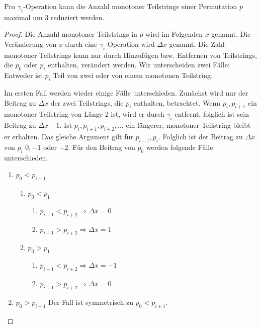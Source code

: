 \documentclass[a4paper, 10pt, ngerman]{article}
\begin{document}
\begin{lemma}
    Pro $\gamma_i$-Operation kann die Anzahl monotoner Teilstrings einer Permutation $p$ maximal um 3 reduziert werden.
\end{lemma}

\begin{proof}
    Die Anzahl monotoner Teilstrings in $p$ wird im Folgenden $x$ genannt. Die Veränderung von $x$ durch eine $\gamma_i$-Operation wird $\Delta x$ genannt. Die Zahl monotoner Teilstrings kann nur durch Hinzufügen bzw. Entfernen von Teilstrings, die $p_0$ oder $p_i$ enthalten, verändert werden. Wir unterscheiden zwei Fälle: Entweder ist $p_i$ Teil von zwei oder von einem monotonen Teilstring.

    Im ersten Fall werden wieder einige Fälle unterschieden. Zunächst wird nur der Beitrag zu $\Delta x$ der zwei Teilstrings, die $p_i$ enthalten, betrachtet. Wenn $p_i, p_{i + 1}$ ein monotoner Teilstring von Länge 2 ist, wird er durch $\gamma_i$ entfernt, folglich ist sein Beitrag zu $\Delta x$ $-1$. Ist $p_i, p_{i + 1}, p_{i + 2}, \dots$ ein längerer, monotoner Teilstring bleibt er erhalten. Das gleiche Argument gilt für $p_{i - 1}, p_i$. Folglich ist der Beitrag zu $\Delta x$ von $p_i$ $0, -1$ oder $-2$.
    Für den Beitrag von $p_0$ werden folgende Fälle unterschieden.

    \begin{enumerate}
        \item $p_0 < p_{i + 1}$
              \begin{enumerate}
                  \item $p_0 < p_1$
                        \begin{enumerate}
                            \item $p_{i + 1} < p_{i + 2} \Longrightarrow \Delta x = 0$
                            \item $p_{i + 1} > p_{i + 2} \Longrightarrow \Delta x = 1$
                        \end{enumerate}
                  \item $p_0 > p_1$
                        \begin{enumerate}
                            \item $p_{i + 1} < p_{i + 2} \Longrightarrow \Delta x = -1$
                            \item $p_{i + 1} > p_{i + 2} \Longrightarrow \Delta x = 0$
                        \end{enumerate}
              \end{enumerate}
        \item $p_0 > p_{i + 1}$ Der Fall ist symmetrisch zu $p_0 < p_{i + 1}$.
    \end{enumerate}


\end{proof}
\end{document}
